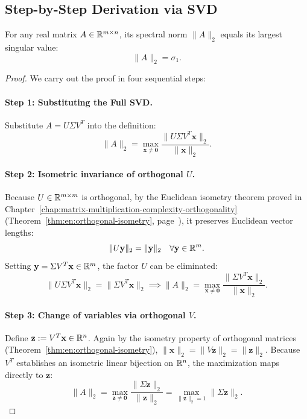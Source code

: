 \subsection{Step-by-Step Derivation via SVD}

\begin{theorem}
\label{thm:spectral-norm-sigma1-en}
For any real matrix $A \in \mathbb{R}^{m \times n}$, its spectral norm $\|A\|_2$ equals its largest singular value:
\begin{equation}
    \|A\|_2 = \sigma_1.
\end{equation}
\end{theorem}

\begin{proof}
We carry out the proof in four sequential steps:

\paragraph{Step 1: Substituting the Full SVD.}
Substitute $A = U \Sigma V^T$ into the definition:
\begin{equation}
    \|A\|_2 = \max_{\mathbf{x} \neq \mathbf{0}} \frac{\|U \Sigma V^T \mathbf{x}\|_2}{\|\mathbf{x}\|_2}.
\end{equation}

\paragraph{Step 2: Isometric invariance of orthogonal $U$.}
Because $U \in \mathbb{R}^{m \times m}$ is orthogonal, by the Euclidean isometry theorem proved in Chapter~\ref{chap:matrix-multiplication-complexity-orthogonality} (Theorem~\ref{thm:en:orthogonal-isometry}, page~\pageref{thm:en:orthogonal-isometry}), it preserves Euclidean vector lengths:
\begin{equation}
    \|U \mathbf{y}\|_2 = \|\mathbf{y}\|_2 \quad \forall \mathbf{y} \in \mathbb{R}^m.
\end{equation}
Setting $\mathbf{y} = \Sigma V^T \mathbf{x} \in \mathbb{R}^m$, the factor $U$ can be eliminated:
\begin{equation}
    \|U \Sigma V^T \mathbf{x}\|_2 = \|\Sigma V^T \mathbf{x}\|_2 \implies \|A\|_2 = \max_{\mathbf{x} \neq \mathbf{0}} \frac{\|\Sigma V^T \mathbf{x}\|_2}{\|\mathbf{x}\|_2}.
\end{equation}

\paragraph{Step 3: Change of variables via orthogonal $V$.}
Define $\mathbf{z} := V^T \mathbf{x} \in \mathbb{R}^n$. Again by the isometry property of orthogonal matrices (Theorem~\ref{thm:en:orthogonal-isometry}), $\|\mathbf{x}\|_2 = \|V \mathbf{z}\|_2 = \|\mathbf{z}\|_2$. Because $V^T$ establishes an isometric linear bijection on $\mathbb{R}^n$, the maximization maps directly to $\mathbf{z}$:
\begin{equation}
    \|A\|_2 = \max_{\mathbf{z} \neq \mathbf{0}} \frac{\|\Sigma \mathbf{z}\|_2}{\|\mathbf{z}\|_2} = \max_{\|\mathbf{z}\|_2 = 1} \|\Sigma \mathbf{z}\|_2.
\end{equation}


\end{proof}
